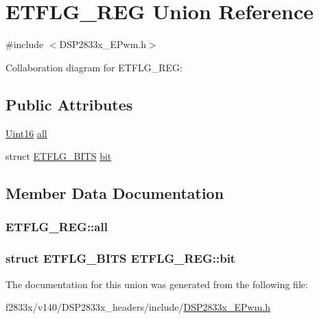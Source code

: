 \hypertarget{union_e_t_f_l_g___r_e_g}{}\section{E\+T\+F\+L\+G\+\_\+\+R\+E\+G Union Reference}
\label{union_e_t_f_l_g___r_e_g}


{\ttfamily \#include $<$D\+S\+P2833x\+\_\+\+E\+Pwm.\+h$>$}



Collaboration diagram for E\+T\+F\+L\+G\+\_\+\+R\+E\+G\+:
\subsection*{Public Attributes}
\begin{DoxyCompactItemize}
\item 
\hyperlink{_d_s_p2833x___device_8h_a59a9f6be4562c327cbfb4f7e8e18f08b}{Uint16} \hyperlink{union_e_t_f_l_g___r_e_g_af6a261522cbb623e97bf54196459d28d}{all}
\item 
struct \hyperlink{struct_e_t_f_l_g___b_i_t_s}{E\+T\+F\+L\+G\+\_\+\+B\+I\+T\+S} \hyperlink{union_e_t_f_l_g___r_e_g_a96c6de06986a851a04ea3d3356bde4f6}{bit}
\end{DoxyCompactItemize}


\subsection{Member Data Documentation}
\hypertarget{union_e_t_f_l_g___r_e_g_af6a261522cbb623e97bf54196459d28d}{}
\subsubsection[{all}]{ E\+T\+F\+L\+G\+\_\+\+R\+E\+G\+::all}\label{union_e_t_f_l_g___r_e_g_af6a261522cbb623e97bf54196459d28d}
\hypertarget{union_e_t_f_l_g___r_e_g_a96c6de06986a851a04ea3d3356bde4f6}{}
\subsubsection[{bit}]{\setlength{\rightskip}{0pt plus 5cm}struct {\bf E\+T\+F\+L\+G\+\_\+\+B\+I\+T\+S} E\+T\+F\+L\+G\+\_\+\+R\+E\+G\+::bit}\label{union_e_t_f_l_g___r_e_g_a96c6de06986a851a04ea3d3356bde4f6}


The documentation for this union was generated from the following file\+:\begin{DoxyCompactItemize}
\item 
f2833x/v140/\+D\+S\+P2833x\+\_\+headers/include/\hyperlink{_d_s_p2833x___e_pwm_8h}{D\+S\+P2833x\+\_\+\+E\+Pwm.\+h}\end{DoxyCompactItemize}

